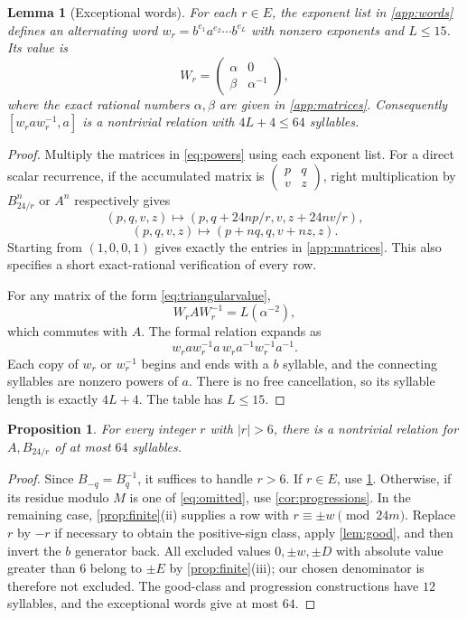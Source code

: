 \documentclass[11pt]{article}
\newtheorem{proposition}[theorem]{Proposition}
\newtheorem{lemma}[theorem]{Lemma}
\theoremstyle{definition}
\theoremstyle{remark}
\numberwithin{equation}{section}
\begin{document}
\begin{lemma}[Exceptional words]\label{lem:exceptional}
For each $r\in E$, the exponent list in \cref{app:words} defines
an alternating word $w_r=b^{e_1}a^{e_2}\cdots b^{e_L}$ with
nonzero exponents and $L\leq15$. Its value is
\begin{equation}\label{eq:triangularvalue}
 W_r=\begin{pmatrix}\alpha&0\\\beta&\alpha^{-1}\end{pmatrix},
\end{equation}
where the exact rational numbers $\alpha,\beta$ are given in
\cref{app:matrices}. Consequently $[w_raw_r^{-1},a]$ is a
nontrivial relation with $4L+4\leq64$ syllables.
\end{lemma}
\begin{proof}
Multiply the matrices in \eqref{eq:powers} using each exponent list.
For a direct scalar recurrence, if the accumulated matrix is
$\left(\begin{smallmatrix}p&q\\v&z\end{smallmatrix}\right)$,
right multiplication by $B_{24/r}^n$ or $A^n$ respectively gives
\[
 (p,q,v,z)\longmapsto(p,q+24np/r,v,z+24nv/r),
\]
\[
 (p,q,v,z)\longmapsto(p+nq,q,v+nz,z).
\]
Starting from $(1,0,0,1)$ gives exactly the entries in
\cref{app:matrices}. This also specifies a short exact-rational
verification of every row.

For any matrix of the form \eqref{eq:triangularvalue},
\[
 W_rAW_r^{-1}=L(\alpha^{-2}),
\]
which commutes with $A$. The formal relation expands as
\[
 w_raw_r^{-1}a\,w_ra^{-1}w_r^{-1}a^{-1}.
\]
Each copy of $w_r$ or $w_r^{-1}$ begins and ends with a $b$
syllable, and the connecting syllables are nonzero powers of $a$.
There is no free cancellation, so its syllable length is exactly
$4L+4$. The table has $L\leq15$.
\end{proof}

\begin{proposition}\label{prop:allrelations}
For every integer $r$ with $|r|>6$, there is a nontrivial relation
for $A,B_{24/r}$ of at most $64$ syllables.
\end{proposition}
\begin{proof}
Since $B_{-q}=B_q^{-1}$, it suffices to handle $r>6$.
If $r\in E$, use \cref{lem:exceptional}. Otherwise, if its
residue modulo $M$ is one of \eqref{eq:omitted}, use
\cref{cor:progressions}. In the remaining case,
\cref{prop:finite}(ii) supplies a row with
$r\equiv\pm w\pmod{24m}$. Replace $r$ by $-r$ if necessary
to obtain the positive-sign class, apply \cref{lem:good}, and
then invert the $b$ generator back. All excluded values
$0,\pm w,\pm D$ with absolute value greater than $6$ belong to
$\pm E$ by \cref{prop:finite}(iii); our chosen denominator is
therefore not excluded. The good-class and progression constructions
have $12$ syllables, and the exceptional words give at most $64$.
\end{proof}
\end{document}
